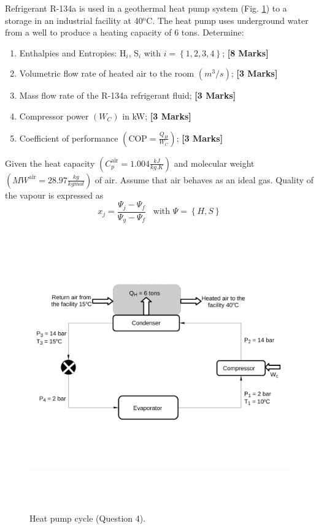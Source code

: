\documentclass[calculator,steamtables,refrigeranttables]{exam}
\newcommand{\frc}{\displaystyle\frac}
\begin{document}
\begin{question}%
Refrigerant R-134a is used in a geothermal heat pump system (Fig. \ref{Exam01_Prob4}) to a storage in an industrial facility at 40$^{\text{o}}$C. The heat pump uses underground water from a well to produce a heating capacity of 6 tons. Determine:
\begin{enumerate}
 \item Enthalpies and Entropies: H$_{i}$, S$_{i}$ with $i=\left\{1,2,3,4\right\}$; {\bf[8 Marks]}
 \item Volumetric flow rate of heated air to the room $\left(m^{3}/s\right)$; {\bf[3 Marks]}
 \item Mass flow rate of the R-134a refrigerant fluid; {\bf[3 Marks]}
 \item Compressor power $\left(W_{C}\right)$ in kW; {\bf[3 Marks]}
 \item Coefficient of performance $\left(\text{COP}=\frc{Q_{H}}{W_{C}}\right)$; {\bf[3 Marks]}
\end{enumerate}
Given the heat capacity $\left(C_{p}^{\text{air}}=1.004\displaystyle\frac{kJ}{kg.K}\right)$ and molecular weight $\left(MW^{\text{air}}=28.97\displaystyle\frac{kg}{kgmol}\right)$ of air. Assume that air behaves as an ideal gas. Quality of the vapour is expressed as
\begin{displaymath}
x_{j} = \frc{\Psi_{j}-\Psi_{f}}{\Psi_{g}-\Psi_{f}}\;\;\;\text{with }\Psi=\left\{H,S\right\}
\end{displaymath}

\begin{figure}[h]
\begin{center}
\includegraphics[width=16.0cm,height=12.0cm]{./Pics/Overview_Refrig42}
\end{center}
\caption{Heat pump cycle (Question 4).}\label{Exam01_Prob4}
\end{figure}


\end{question}
\end{document}
